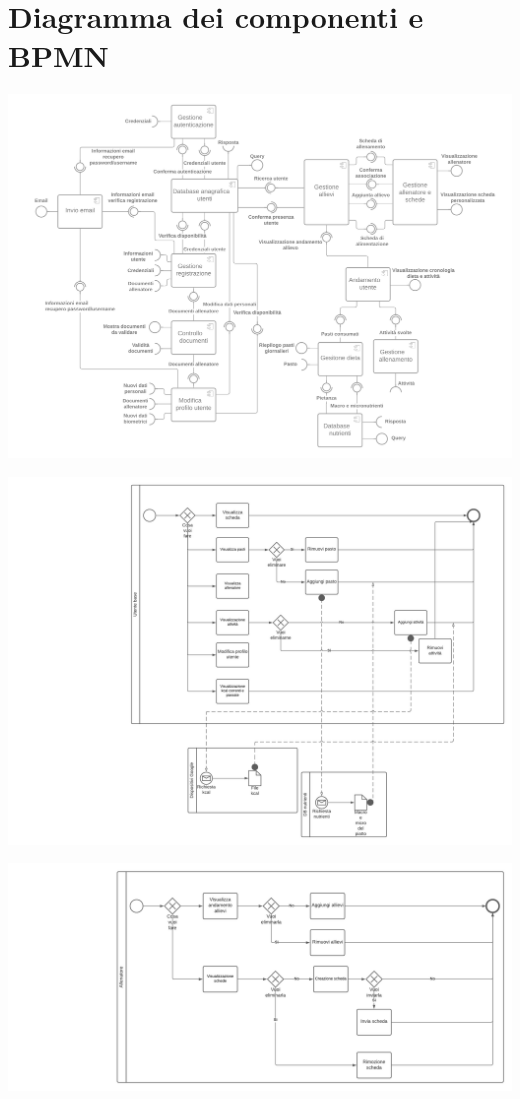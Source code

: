 \documentclass{article}
\begin{document}
      \section{Diagramma dei componenti e BPMN}
      \begin{center}
            \includegraphics[width=200mm]{Component diagram.png}
      \end{center}
      \begin{center}
            \includegraphics[width=200mm]{BPMN1.png}
      \end{center}
      \begin{center}
            \includegraphics[width=200mm]{BPMN2.png}
      \end{center}     
\end{document}

